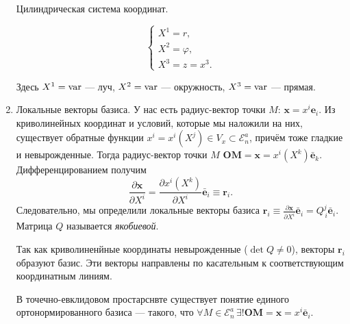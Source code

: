 \begin{enumerate}
    \begin{figure}[H]
    	\centering
    	
    \end{figure}

	\begin{example}
		Цилиндрическая система координат. 
		
		\begin{figure}[H]
			\centering
			
		\end{figure}
		
		\[
		\begin{cases}
			X^1 = r, \\
			X^2 = \varphi, \\
			X^3 = z = x^3.
		\end{cases}
		\]
		
		Здесь $X^1 = \mathrm{var}$ --- луч,
		$X^2 = \mathrm{var}$ --- окружность,
		$X^3 = \mathrm{var}$ --- прямая.
	\end{example}
    

  \item Локальные векторы базиса. У нас есть радиус-вектор точки $M$: $\mathbf{x} = x^i \mathbf{e}_i$. 
    Из криволинейных координат и условий, которые мы наложили на них, существует
    обратные функции
    $x^i = x^i(X^j) \in V_x \subset \mathcal{E}_n^a$, причём тоже гладкие и
    невырожденные. Тогда 
    радиус-вектор точки $M$ $\mathbf{OM} = \mathbf{x} = x^i(X^k) \bar{\mathbf{e}}_k$. Дифференцированием
    получим
    \[
      \dfrac{\partial \mathbf{x}}{\partial X^i} = \dfrac{\partial x^i (X^k)}{\partial X^i} \bar{\mathbf{e}}_i
      \equiv \mathbf{r}_i.
    \]
    Следовательно, мы определили локальные векторы базиса
    $\mathbf{r}_i \equiv \frac{\partial \mathbf{x}}{\partial X^i} \bar{\mathbf{e}}_i
    = Q^j_{\, i} \bar{\mathbf{e}}_i$. Матрица $Q$ называется \emph{якобиевой}.

    Так как криволиненйные координаты невырожденные ($\det Q \neq 0$), векторы $\mathbf{r}_i$ образуют 
    базис. Эти векторы направлены по касательным к соответствующим координатным линиям.
    
	
    В точечно-евклидовом простарснвте существует понятие единого
    ортонормированного базиса --- такого,
    что $\forall M \in \mathcal{E}_n^a \, \exists! \mathbf{OM} = \mathbf{x} = x^i \bar{\mathbf{e}}_i$.
    

\end{enumerate}
